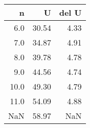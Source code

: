 \begin{tabular}{rrr}
\toprule
   n &     U &  del U \\
\midrule
 6.0 & 30.54 &   4.33 \\
 7.0 & 34.87 &   4.91 \\
 8.0 & 39.78 &   4.78 \\
 9.0 & 44.56 &   4.74 \\
10.0 & 49.30 &   4.79 \\
11.0 & 54.09 &   4.88 \\
 NaN & 58.97 &    NaN \\
\bottomrule
\end{tabular}
